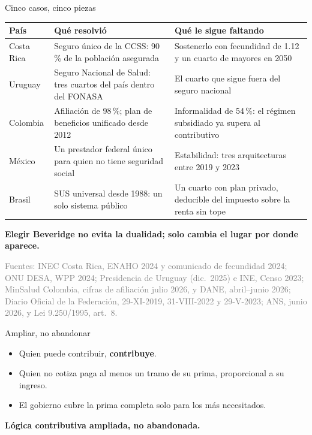 \documentclass[aspectratio=169,11pt]{beamer}
\newcommand{\clave}[1]{\textcolor{acento}{\textbf{#1}}}
\newcommand{\destacar}[1]{\vspace{0.6em}\begin{center}\textbf{#1}\end{center}}
\newcommand{\pie}[1]{\vfill{\scriptsize\textcolor{gray}{#1}}}
\begin{document}
\begin{frame}{Cinco casos, cinco piezas}
  \begin{center}\small
  \begin{tabular}{@{}p{2.0cm}p{5.6cm}p{5.6cm}@{}}
    \toprule
    \textbf{País} & \textbf{Qué resolvió} & \textbf{Qué le sigue faltando} \\
    \midrule
    Costa Rica & Seguro único de la CCSS: 90\,\% de la población asegurada & Sostenerlo con fecundidad de 1.12 y un cuarto de mayores en 2050 \\[0.3em]
    Uruguay    & Seguro Nacional de Salud: tres cuartos del país dentro del FONASA & El cuarto que sigue fuera del seguro nacional \\[0.3em]
    Colombia   & Afiliación de 98\,\%; plan de beneficios unificado desde 2012 & Informalidad de 54\,\%: el régimen subsidiado ya supera al contributivo \\[0.3em]
    México     & Un prestador federal único para quien no tiene seguridad social & Estabilidad: tres arquitecturas entre 2019 y 2023 \\[0.3em]
    Brasil     & SUS universal desde 1988: un solo sistema público & Un cuarto con plan privado, deducible del impuesto sobre la renta sin tope \\
    \bottomrule
  \end{tabular}
  \end{center}
  \destacar{Elegir Beveridge no evita la dualidad; solo cambia el lugar por donde aparece.}
  \pie{Fuentes: INEC Costa Rica, ENAHO 2024 y comunicado de fecundidad 2024; ONU DESA, WPP 2024; Presidencia de Uruguay (dic.\ 2025) e INE, Censo 2023; MinSalud Colombia, cifras de afiliación julio 2026, y DANE, abril--junio 2026; Diario Oficial de la Federación, 29-XI-2019, 31-VIII-2022 y 29-V-2023; ANS, junio 2026, y Lei 9.250/1995, art.~8.}
\end{frame}


\begin{frame}{Ampliar, no abandonar}
  \begin{itemize}
    \item Quien puede contribuir, \clave{contribuye}.
    \item Quien no cotiza paga al menos un tramo de su prima, proporcional a su ingreso.
    \item El gobierno cubre la prima completa solo para los más necesitados.
  \end{itemize}
  \destacar{Lógica contributiva ampliada, no abandonada.}
\end{frame}
\end{document}
